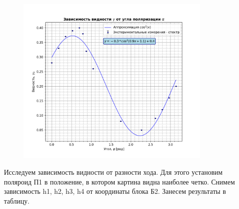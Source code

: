 \documentclass[a4paper, 12pt]{article}
\begin{document}
\begin{figure}[H]
    \centering
    \includegraphics[width=0.85\textwidth]{plot4--5--2-1.png}
    \label{fig:plot3}
\end{figure}
Исследуем зависимость видности от разности хода. Для этого установим поляроид П1 в положение, в котором картина видна наиболее четко. Снимем зависимость h1, h2, h3, h4 от координаты блока Б2.
Занесем результаты в таблицу.
\end{document}
